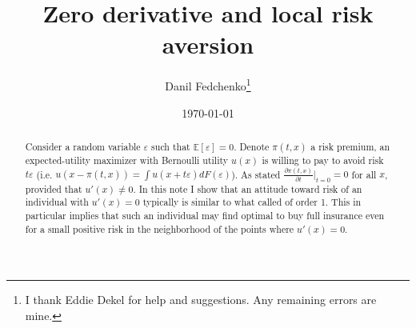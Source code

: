 \documentclass[a4paper]{article}
\title{Zero derivative and local risk aversion}
\author{Danil Fedchenko\thanks{I thank Eddie Dekel for help and suggestions. Any remaining errors are mine. }}
\affil{Northwestern University}
\date{\today}
\newcommand{\expect}{\mathbb{E}}
\begin{document}
	\maketitle
	\begin{abstract}
	Consider a random variable $\varepsilon$ such that $\expect[\varepsilon] = 0$. Denote $\pi(t, x)$ a risk premium, an expected-utility maximizer with Bernoulli utility $u(x)$ is willing to pay to avoid risk $t \varepsilon$ (i.e. $u(x-\pi(t, x)) = \int u(x+t\varepsilon)dF(\varepsilon)$). As \cite{segal1990first} stated $\frac{\partial \pi(t, x)}{\partial t}\bigg|_{t=0} = 0$ for all $x$, provided that $u'(x) \neq 0$. In this note I show that an attitude toward risk of an individual with $u'(x) = 0$ typically is similar to what \cite{segal1990first} called of order 1. This in particular implies that such an individual may find optimal to buy full insurance even for a small positive risk in the neighborhood of the points where $u'(x) = 0$.
	\end{abstract}
	\newpage
\end{document}
